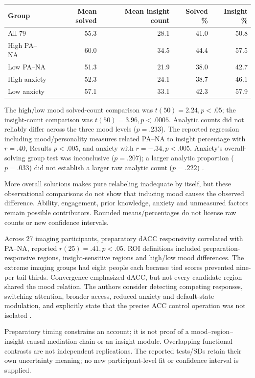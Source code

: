 \begin{tabular}{@{}lrrrr@{}}
\toprule Group &Mean solved &Mean insight count &Solved \% &Insight \%\\
\midrule
All 79 &55.3&28.1&41.0&50.8\\
High PA--NA &60.0&34.5&44.4&57.5\\
Low PA--NA &51.3&21.9&38.0&42.7\\
High anxiety &52.3&24.1&38.7&46.1\\
Low anxiety &57.1&33.1&42.3&57.9\\
\bottomrule
\end{tabular}

The high/low mood solved-count comparison was \(t(50)=2.24,p<.05\);
the insight-count comparison was \(t(50)=3.96,p<.0005\).
Analytic counts did not reliably differ across the three mood levels
(\(p=.233\)).
The reported regression including mood/personality measures related PA--NA
to insight percentage with \(r=.40\), Results \(p<.005\), and anxiety
with \(r=-.34,p<.005\).
Anxiety's overall-solving group test was inconclusive (\(p=.207\));
a larger analytic proportion (\(p=.033\)) did not establish a larger
raw analytic count (\(p=.222\))
\parencite[pp.~421--422,426]{SubramaniamEtAl2009PositiveAffect}.

More overall solutions makes pure relabeling inadequate by itself,
but these observational comparisons do not show that inducing mood causes
the observed difference. Ability, engagement, prior knowledge, anxiety and
unmeasured factors remain possible contributors.
Rounded means/percentages do not license raw counts or new confidence intervals.

Across 27 imaging participants, preparatory dACC responsivity correlated
with PA--NA, reported \(r(25)=.41,p<.05\).
ROI definitions included preparation-responsive regions, insight-sensitive
regions and high/low mood differences. The extreme imaging groups had
eight people each because tied scores prevented nine-per-tail thirds.
Convergence emphasized dACC, but not every candidate region shared the mood
relation. The authors consider detecting competing responses, switching
attention, broader access, reduced anxiety and default-state modulation,
and explicitly state that the precise ACC control operation was not isolated
\parencite[pp.~420--430,note~1]{SubramaniamEtAl2009PositiveAffect}.

Preparatory timing constrains an account; it is not proof of a mood--region--insight
causal mediation chain or an insight module.
Overlapping functional contrasts are not independent replications.
The reported tests/SDs retain their own uncertainty meaning; no new
participant-level fit or confidence interval is supplied.

